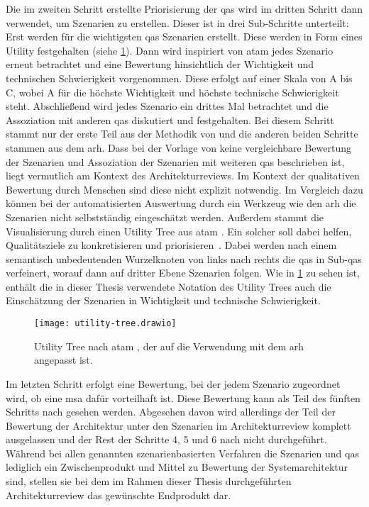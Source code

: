 Die im zweiten Schritt erstellte Priorisierung der \glspl{qa} wird im dritten Schritt dann verwendet, um Szenarien zu erstellen.
Dieser ist in drei Sub-Schritte unterteilt:
Erst werden für die wichtigsten \glspl{qa} Szenarien erstellt.
Diese werden in Form eines Utility festgehalten (siehe \cref{fig:utility-tree}).
Dann wird inspiriert von \gls{atam} \cite{kazman_2000} jedes Szenario erneut betrachtet und eine Bewertung hinsichtlich der Wichtigkeit und technischen Schwierigkeit vorgenommen.
Diese erfolgt auf einer Skala von A bis C, wobei A für die höchste Wichtigkeit und höchste technische Schwierigkeit steht.
Abschließend wird jedes Szenario ein drittes Mal betrachtet und die Assoziation mit anderen \glspl{qa} diskutiert und festgehalten.
Bei diesem Schritt stammt nur der erste Teil aus der Methodik von  und die anderen beiden Schritte stammen aus dem \gls{arh}.
Dass bei der Vorlage von  keine vergleichbare Bewertung der Szenarien und Assoziation der Szenarien mit weiteren \glspl{qa} beschrieben ist, liegt vermutlich am Kontext des Architekturreviews.
Im Kontext der qualitativen Bewertung durch Menschen sind diese nicht explizit notwendig.
Im Vergleich dazu können bei der automatisierten Auswertung durch ein Werkzeug wie den \gls{arh} die Szenarien nicht selbstständig eingeschätzt werden.
Außerdem stammt die Visualisierung durch einen Utility Tree aus \gls{atam} \cite{kazman_2000}.
Ein solcher soll dabei helfen, Qualitätsziele zu konkretisieren und priorisieren~\cite{kazman_2000}.
Dabei werden nach einem semantisch unbedeutenden Wurzelknoten von links nach rechts die \glspl{qa} in Sub-\glspl{qa} verfeinert, worauf dann auf dritter Ebene Szenarien folgen.
Wie in \cref{fig:utility-tree} zu sehen ist, enthält die in dieser Thesis verwendete Notation des Utility Trees auch die Einschätzung der Szenarien in Wichtigkeit und technische Schwierigkeit.
\begin{figure}[!h]
	\centering
	\texttt{[image: utility-tree.drawio]}
	\caption[Utility Tree nach \acrshort{atam}]{
		Utility Tree nach \gls{atam} \cite{kazman_2000}, der auf die Verwendung mit dem \gls{arh} angepasst ist.
	}
	\label{fig:utility-tree}
\end{figure}


Im letzten Schritt erfolgt eine Bewertung, bei der jedem Szenario zugeordnet wird, ob eine \gls{msa} dafür vorteilhaft ist.
Diese Bewertung kann als Teil des fünften Schritts nach  gesehen werden.
Abgesehen davon wird allerdings der Teil der Bewertung der Architektur unter den Szenarien im Architekturreview komplett ausgelassen und der Rest der Schritte 4, 5 und 6 nach  nicht durchgeführt.
Während bei allen genannten szenarienbasierten Verfahren die Szenarien und \glspl{qa} lediglich ein Zwischenprodukt und Mittel zu Bewertung der Systemarchitektur sind, stellen sie bei dem im Rahmen dieser Thesis durchgeführten Architekturreview das gewünschte Endprodukt dar.

